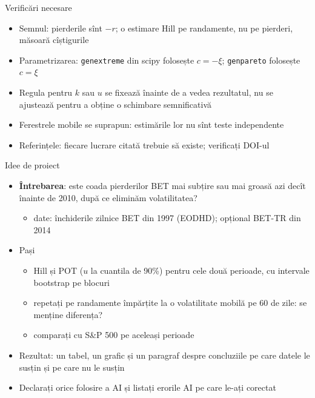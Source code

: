 \begin{frame}{Verificări necesare}
\itemsize{\small}
\begin{itemize}
    \item Semnul: pierderile sînt $-r$; o estimare Hill pe randamente, nu pe pierderi, măsoară cîștigurile
    \item Parametrizarea: \texttt{genextreme} din scipy folosește $c = -\xi$; \texttt{genpareto} folosește $c = \xi$
    \item Regula pentru $k$ sau $u$ se fixează înainte de a vedea rezultatul, nu se ajustează pentru a obține o schimbare semnificativă
    \item Ferestrele mobile se suprapun: estimările lor nu sînt teste independente
    \item Referințele: fiecare lucrare citată trebuie să existe; verificați DOI-ul
\end{itemize}
\end{frame}

\begin{frame}{Idee de proiect}
\itemsize{\small}
\begin{itemize}
    \item \textbf{Întrebarea}: este coada pierderilor BET mai subțire sau mai groasă azi decît înainte de 2010, după ce eliminăm volatilitatea?
    \begin{itemize}
        \item date: închiderile zilnice BET din 1997 (EODHD); opțional BET-TR din 2014
    \end{itemize}
    \item Pași
    \begin{itemize}
        \item Hill și POT ($u$ la cuantila de 90\%) pentru cele două perioade, cu intervale bootstrap pe blocuri
        \item repetați pe randamente împărțite la o volatilitate mobilă pe 60 de zile: se menține diferența?
        \item comparați cu S\&P 500 pe aceleași perioade
    \end{itemize}
    \item Rezultat: un tabel, un grafic și un paragraf despre concluziile pe care datele le susțin și pe care nu le susțin
    \item Declarați orice folosire a AI și listați erorile AI pe care le-ați corectat
\end{itemize}
\end{frame}



